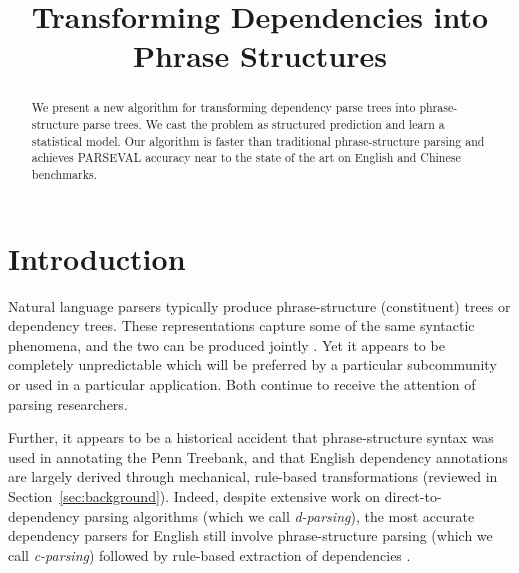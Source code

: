 \documentclass[11pt,letterpaper]{article}
\title{Transforming Dependencies into Phrase Structures}
\author{}
\date{}
\newcommand{\nascomment}[1]{\textcolor{blue}{\bf \small [#1 --nas]}}
\begin{document}
\maketitle
\begin{abstract}
We present a new algorithm for transforming dependency parse trees into
phrase-structure parse trees.  We cast the problem as  structured
prediction and learn a statistical model.  Our algorithm is faster than traditional
phrase-structure parsing and achieves PARSEVAL accuracy near to the state of
the art on English and Chinese benchmarks.




\end{abstract}

\section{Introduction}


Natural language parsers typically produce phrase-structure (constituent) trees or dependency trees.  These representations capture
some of the same syntactic phenomena, and the two can be produced
jointly \cite{klein2002fast,carreras2008tag,rush2010dual}.  Yet it
appears to be completely unpredictable which will be preferred by a
particular subcommunity or used in a particular application.  Both continue to receive the attention of
parsing researchers.


Further, it appears to be a historical accident that phrase-structure
syntax was used in annotating the Penn Treebank, and that English
dependency annotations are largely derived through mechanical,
rule-based transformations (reviewed in Section~\ref{sec:background}).  Indeed,
despite extensive work on direct-to-dependency parsing algorithms
(which we call \emph{d-parsing}), the most accurate dependency
parsers for English still involve phrase-structure parsing (which we
call \emph{c-parsing}) followed by rule-based extraction of
dependencies \cite{kong2014empirical}.
\end{document}
